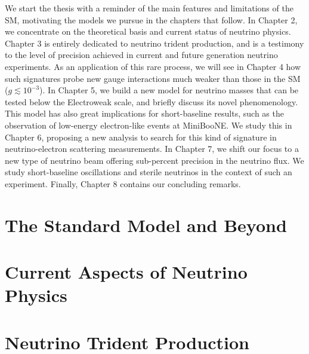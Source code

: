 \documentclass[openany,twoside,frontopenright,openright]{ip3thesis}
\begin{document}
We start the thesis with a reminder of the main features and limitations of the SM, motivating the models we pursue in the chapters that follow. In Chapter 2, we concentrate on the theoretical basis and current status of neutrino physics. Chapter 3 is entirely dedicated to neutrino trident production, and is a testimony to the level of precision achieved in current and future generation neutrino experiments. As an application of this rare process, we will see in Chapter 4 how such signatures probe new gauge interactions much weaker than those in the SM ($g \lesssim 10^{-3}$). In Chapter 5, we build a new model for neutrino masses that can be tested below the Electroweak scale, and briefly discuss its novel phenomenology. This model has also great implications for short-baseline results, such as the observation of low-energy electron-like events at MiniBooNE. We study this in Chapter 6, proposing a new analysis to search for this kind of signature in neutrino-electron scattering measurements. In Chapter 7, we shift our focus to a new type of neutrino beam offering sub-percent precision in the neutrino flux. We study short-baseline oscillations and sterile neutrinos in the context of such an experiment. Finally, Chapter 8 contains our concluding remarks.    



\chapter{The Standard Model and Beyond}


\chapter{Current Aspects of Neutrino Physics}


\chapter{Neutrino Trident Production}


\cleardoublepage

\end{document}
